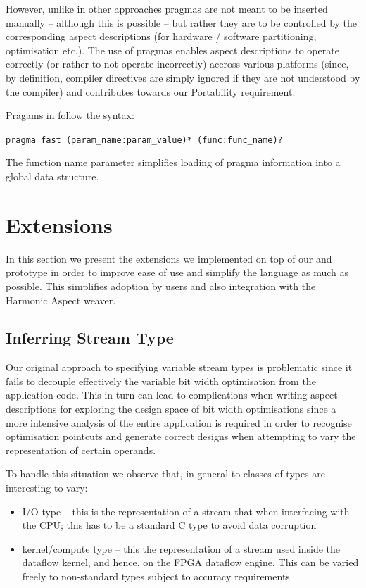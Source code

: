 However, unlike in other approaches pragmas are not
meant to be inserted manually -- although this is possible -- but
rather they are to be controlled by the corresponding aspect
descriptions (for hardware / software partitioning, optimisation
etc.). The use of pragmas enables aspect descriptions to operate
correctly (or rather to not operate incorrectly) accross various
platforms (since, by definition, compiler directives are simply
ignored if they are not understood by the compiler) and contributes
towards our Portability requirement.

Pragams in \FAST{} follow the syntax:

\texttt{pragma fast (param\_name:param\_value)* (func:func\_name)?}

The function name parameter simplifies loading of pragma information
into a global data structure.

\section{Extensions}

\label{sec:fast-extensions}

In this section we present the extensions we implemented on top of our
\FAST{} and \fastc{} prototype in order to improve ease of use and
simplify the language as much as possible. This simplifies adoption by
users and also integration with the Harmonic Aspect weaver.

\subsection{Inferring Stream Type}
\label{sec:inf-stream-type}

Our original approach to specifying variable stream types is
problematic since it fails to decouple effectively the variable bit
width optimisation from the application code. This in turn can lead to
complications when writing aspect descriptions for exploring the
design space of bit width optimisations since a more intensive
analysis of the entire application is required in order to recognise
optimisation pointcuts and generate correct designs when attempting to
vary the representation of certain operands.

To handle this situation we observe that, in general to classes of
types are interesting to vary:
\begin{itemize}
\item I/O type -- this is the representation of a stream that when
  interfacing with the CPU; this has to be a standard C type to avoid
  data corruption
\item kernel/compute type -- this the representation of a stream used
  inside the dataflow kernel, and hence, on the FPGA dataflow
  engine. This can be varied freely to non-standard types subject to
  accuracy requirements
\end{itemize}


